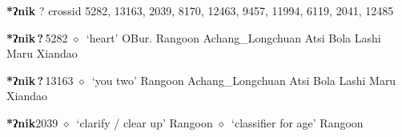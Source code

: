 \textbf{*ʔnik}
?
  {\tiny crossid 5282, 13163, 2039, 8170, 12463, 9457, 11994, 6119, 2041, 12485}
  \begin{list}{}{\leftmargin=1.5em \itemindent=-1.5em}
  \item {\footnotesize \textbf{*ʔnik\,?\,}}{\tiny 5282}
         $\diamond$~`heart'
         OBur. 
\hspace{1ex}
         Rangoon 
\hspace{1ex}
         Achang\_Longchuan 
\hspace{1ex}
         Atsi 
\hspace{1ex}
         Bola 
\hspace{1ex}
         Lashi 
\hspace{1ex}
         Maru 
\hspace{1ex}
         Xiandao 
  \item {\footnotesize \textbf{*ʔnik\,?\,}}{\tiny 13163}
\hspace{1ex}
         $\diamond$~`you two'
         Rangoon 
\hspace{1ex}
         Achang\_Longchuan 
\hspace{1ex}
         Atsi 
\hspace{1ex}
         Bola 
\hspace{1ex}
         Lashi 
\hspace{1ex}
         Maru 
\hspace{1ex}
         Xiandao 
  \item {\footnotesize \textbf{*ʔnik}}{\tiny 2039}
\hspace{1ex}
         $\diamond$~`clarify / clear up'
         Rangoon 
\hspace{1ex}
         $\diamond$~`classifier for age'
         Rangoon 
\hspace{1ex}

\end{list}
